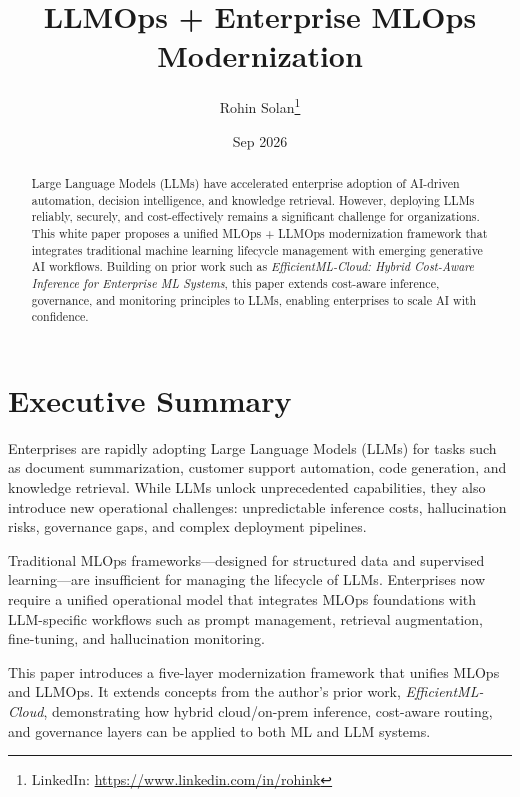 \documentclass[11pt]{article}
\begin{document}
\title{LLMOps + Enterprise MLOps Modernization}
\author{
  Rohin Solan\thanks{LinkedIn: \href{https://www.linkedin.com/in/rohink}{https://www.linkedin.com/in/rohink}}
}

\date{Sep 2026}
\maketitle


\begin{abstract}
Large Language Models (LLMs) have accelerated enterprise adoption of AI-driven automation, decision intelligence, and knowledge retrieval. However, deploying LLMs reliably, securely, and cost-effectively remains a significant challenge for organizations. This white paper proposes a unified MLOps + LLMOps modernization framework that integrates traditional machine learning lifecycle management with emerging generative AI workflows. Building on prior work such as \textit{EfficientML-Cloud: Hybrid Cost-Aware Inference for Enterprise ML Systems}, this paper extends cost-aware inference, governance, and monitoring principles to LLMs, enabling enterprises to scale AI with confidence.
\end{abstract}

\section{Executive Summary}
Enterprises are rapidly adopting Large Language Models (LLMs) for tasks such as document summarization, customer support automation, code generation, and knowledge retrieval. While LLMs unlock unprecedented capabilities, they also introduce new operational challenges: unpredictable inference costs, hallucination risks, governance gaps, and complex deployment pipelines.

Traditional MLOps frameworks—designed for structured data and supervised learning—are insufficient for managing the lifecycle of LLMs. Enterprises now require a unified operational model that integrates MLOps foundations with LLM-specific workflows such as prompt management, retrieval augmentation, fine-tuning, and hallucination monitoring.

This paper introduces a five-layer modernization framework that unifies MLOps and LLMOps. It extends concepts from the author's prior work, \textit{EfficientML-Cloud}, demonstrating how hybrid cloud/on-prem inference, cost-aware routing, and governance layers can be applied to both ML and LLM systems.
\end{document}
